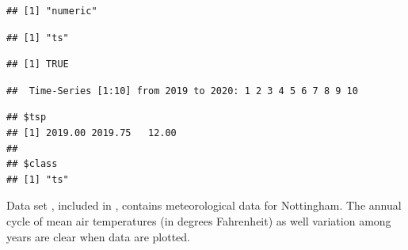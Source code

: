 \documentclass[krantz2]{krantz}\usepackage{knitr}
\begin{document}
\begin{knitrout}\footnotesize
{}\color{fgcolor}\begin{kframe}
\begin{alltt}
\end{alltt}
\begin{verbatim}
## [1] "numeric"
\end{verbatim}
\begin{alltt}
\end{alltt}
\begin{verbatim}
## [1] "ts"
\end{verbatim}
\begin{alltt}
\end{alltt}
\begin{verbatim}
## [1] TRUE
\end{verbatim}
\begin{alltt}
\end{alltt}
\begin{verbatim}
##  Time-Series [1:10] from 2019 to 2020: 1 2 3 4 5 6 7 8 9 10
\end{verbatim}
\begin{alltt}
\end{alltt}
\begin{verbatim}
## $tsp
## [1] 2019.00 2019.75   12.00
## 
## $class
## [1] "ts"
\end{verbatim}
\end{kframe}
\end{knitrout}

Data set , included in \Rlang, contains meteorological data for Nottingham. The annual cycle of mean air temperatures (in degrees Fahrenheit) as well variation among years are clear when data are plotted.
\end{document}
